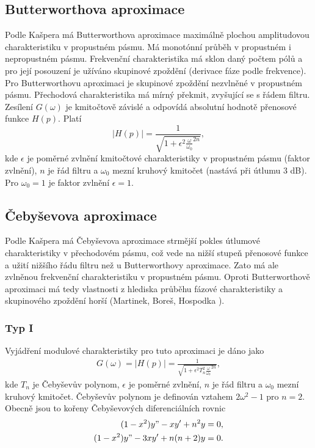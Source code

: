 \subsection{Butterworthova aproximace}
Podle Kašpera \cite{7} má Butterworthova aproximace maximálně plochou amplitudovou charakteristiku v propustném pásmu. Má monotónní průběh v propustném i nepropustném pásmu. Frekvenční charakteristika má sklon daný počtem pólů a pro její posouzení je užíváno skupinové zpoždění (derivace fáze podle frekvence). Pro Butterworthovu aproximaci je skupinové zpoždění nezvlněné v propustném pásmu. Přechodová charakteristika má mírný překmit, zvyšující se s řádem filtru. Zesílení $G(\omega)$ je kmitočtově závislé a odpovídá absolutní hodnotě přenosové funkce $H(p)$. Platí
\begin{equation}
|H(p)| = \frac{1}{\sqrt{1 + \epsilon ^2 \frac{\omega}{\omega _0}^{2n}}},
\end{equation}
kde $\epsilon$ je poměrné zvlnění kmitočtové charakteristiky v propustném pásmu (faktor zvlnění), $n$ je řád filtru a $\omega _0$ mezní kruhový kmitočet (nastává při útlumu 3 dB). Pro $\omega _0 = 1$ je faktor zvlnění $\epsilon = 1$. 
\subsection{Čebyševova aproximace}
Podle Kašpera \cite{7} má Čebyševova aproximace strmější pokles útlumové charakteristiky v přechodovém pásmu, což vede na nižší stupeň přenosové funkce a užití nižšího řádu filtru než u Butterworthovy aproximace. Zato má ale zvlněnou frekvenční charakteristiku v propustném pásmu. Oproti Butterworthově aproximaci má tedy vlastnosti z hlediska průběhu fázové charakteristiky a skupinového zpoždění horší (Martinek, Boreš, Hospodka \cite{12}).
\subsubsection{Typ I}
Vyjádření modulové charakteristiky pro tuto aproximaci je dáno jako
\begin{align}
G(\omega) = |H(p)| = \frac{1}{\sqrt{1 + \epsilon ^2 T_n ^2 \frac{\omega}{\omega _0}^{2n}}},
\end{align}
kde $T_n$ je Čebyševův polynom, $\epsilon$ je poměrné zvlnění, $n$ je řád filtru a $\omega _0$ mezní kruhový kmitočet. Čebyševův polynom je definován vztahem $2 \omega ^2 - 1$ pro $n = 2$. Obecně jsou to kořeny Čebyševových diferenciálních rovnic
\begin{align}
(1 - x^2)y" - xy' + n^2y &= 0,\\
(1 - x^2)y" - 3xy' + n(n+2)y &= 0.
\end{align}
